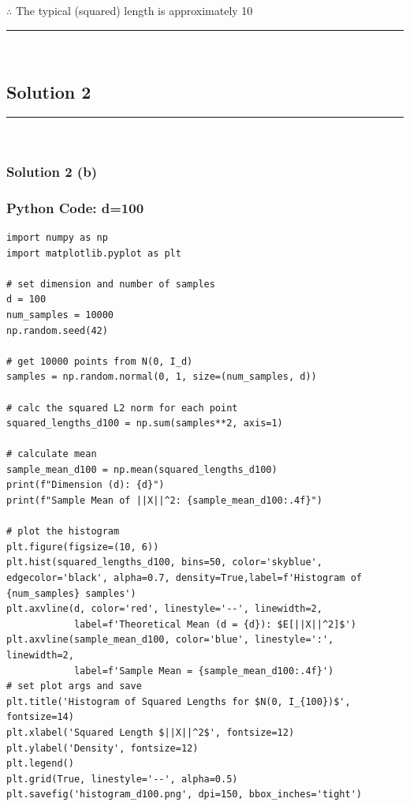 \documentclass{article}
\begin{document}
\subsubsection*{\normalfont}{$\therefore$ The typical (squared) length is approximately 10}

\noindent\rule{\textwidth}{0.4pt}\\

\newpage

\subsection*{Solution 2}
\noindent\rule{\textwidth}{0.4pt}\\
\subsubsection*{Solution 2 (b)}
\subsubsection*{Python Code: d=100}
\begin{lstlisting}
import numpy as np
import matplotlib.pyplot as plt

# set dimension and number of samples
d = 100
num_samples = 10000
np.random.seed(42) 

# get 10000 points from N(0, I_d)
samples = np.random.normal(0, 1, size=(num_samples, d))

# calc the squared L2 norm for each point
squared_lengths_d100 = np.sum(samples**2, axis=1)

# calculate mean
sample_mean_d100 = np.mean(squared_lengths_d100)
print(f"Dimension (d): {d}")
print(f"Sample Mean of ||X||^2: {sample_mean_d100:.4f}")

# plot the histogram
plt.figure(figsize=(10, 6))
plt.hist(squared_lengths_d100, bins=50, color='skyblue', edgecolor='black', alpha=0.7, density=True,label=f'Histogram of {num_samples} samples')
plt.axvline(d, color='red', linestyle='--', linewidth=2, 
            label=f'Theoretical Mean (d = {d}): $E[||X||^2]$')
plt.axvline(sample_mean_d100, color='blue', linestyle=':', linewidth=2, 
            label=f'Sample Mean = {sample_mean_d100:.4f}')
# set plot args and save
plt.title('Histogram of Squared Lengths for $N(0, I_{100})$', fontsize=14)
plt.xlabel('Squared Length $||X||^2$', fontsize=12)
plt.ylabel('Density', fontsize=12)
plt.legend()
plt.grid(True, linestyle='--', alpha=0.5)
plt.savefig('histogram_d100.png', dpi=150, bbox_inches='tight')
\end{lstlisting}
\end{document}

